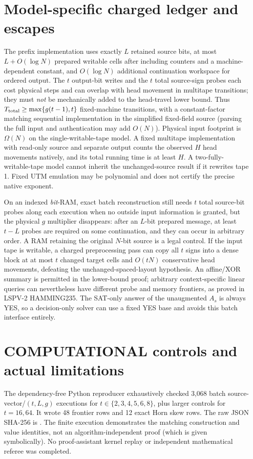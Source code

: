 \documentclass[10pt]{article}
\begin{document}
\section{Model-specific charged ledger and escapes}
The prefix implementation uses exactly $L$ retained source bits, at most $L+O(\log N)$ prepared writable cells after including counters and a machine-dependent constant, and $O(\log N)$ additional continuation workspace for ordered output. The $t$ output-bit writes and the $t$ total source-sign probes each cost physical steps and can overlap with head movement in multitape transitions; they must \emph{not} be mechanically added to the head-travel lower bound. Thus $T_{\rm total}\ge\max\{g(t-1),t\}$ fixed-machine transitions, with a constant-factor matching sequential implementation in the simplified fixed-field source (parsing the full input and authentication may add $O(N)$). Physical input footprint is $\Omega(N)$ on the single-writable-tape model. A fixed multitape implementation with read-only source and separate output counts the observed $H$ head movements natively, and its total running time is at least $H$. A two-fully-writable-tape model cannot inherit the unchanged-source result if it rewrites tape 1. Fixed UTM emulation may be polynomial and does not certify the precise native exponent.

On an indexed \emph{bit}-RAM, exact batch reconstruction still needs $t$ total source-bit probes along each execution when no outside input information is granted, but the physical $g$ multiplier disappears: after an $L$-bit prepared message, at least $t-L$ probes are required on some continuation, and they can occur in arbitrary order. A RAM retaining the original $N$-bit source is a legal control. If the input tape is writable, a charged preprocessing pass can copy all $t$ signs into a dense block at at most $t$ changed target cells and $O(tN)$ conservative head movements, defeating the unchanged-spaced-layout hypothesis. An affine/XOR summary is permitted in the lower-bound proof; arbitrary context-specific linear queries can nevertheless have different probe and memory frontiers, as proved in LSPV-2 HAMMING235. The SAT-only answer of the unaugmented $A_s$ is always YES, so a decision-only solver can use a fixed YES base and avoids this batch interface entirely.

\section{COMPUTATIONAL controls and actual limitations}
The dependency-free Python reproducer exhaustively checked 3,068 batch source-vector/$(t,L,g)$ executions for $t\in\{2,3,4,5,6,8\}$, plus larger controls for $t=16,64$. It wrote 48 frontier rows and 12 exact Horn skew rows. The raw JSON SHA-256 is . The finite execution demonstrates the matching construction and value identities, not an algorithm-independent proof (which is given symbolically). No proof-assistant kernel replay or independent mathematical referee was completed.
\end{document}
